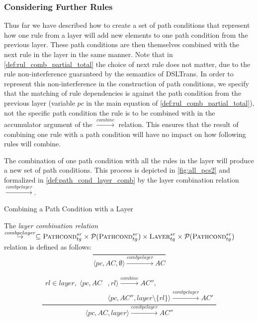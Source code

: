 \subsubsection{Considering Further Rules}
\label{sec:further_rules}
Thus far we have described how to create a set of path conditions that represent how one rule from a layer will add new elements to one path condition from the previous layer. These path conditions are then themselves combined with the next rule in the layer in the same manner. Note that in \cref{def:rul_comb_partial_total} the choice of next rule does not matter, due to the rule non-interference guaranteed by the semantics of DSLTrans. In order to represent this non-interference in the construction of path conditions, we specify that the matching of rule dependencies is against the path condition from the previous layer (variable $pc$ in the main equation of \cref{def:rul_comb_partial_total}), not the specific path condition the rule is to be combined with in the accumulator argument of the $\stackrel{combine}{\rightarrow}$ relation. This ensures that the result of combining one rule with a path condition will have no impact on how following rules will combine.


The combination of one path condition with all the rules in the layer will produce a new set of path conditions. This process is depicted in \cref{fig:all_pcs2} and formalized in \cref{def:path_cond_layer_comb} by the layer combination relation $\stackrel{combpclayer}{\rightarrow}$.

\begin{definition} {Combining a Path Condition with a Layer\\}
\label{def:path_cond_layer_comb}

The \emph{layer combination relation}
$\stackrel{combpclayer}{\rightarrow}\subseteq \textsc{Pathcond}^{sr}_{tg} \times\\ \mathcal{P}(\textsc{Pathcond}^{sr}_{tg}) \times \textsc{Layer}^{sr}_{tg}\times
\mathcal{P}(\textsc{Pathcond}^{sr}_{tg})$ relation is defined as follows:
$$\frac{}
{\langle pc,AC,\emptyset\rangle \xrightarrow{combpclayer} AC}$$

$$\frac{\begin{array}{ll}rl\in layer,\;\langle pc,AC&,rl\rangle\xrightarrow{combine}AC'',\\ &\langle pc,AC'',layer\setminus\{rl\}\rangle\xrightarrow{combpclayer}AC'
\end{array}}
{\langle pc,AC,layer\rangle \xrightarrow{combpclayer} AC''}$$

\end{definition}

